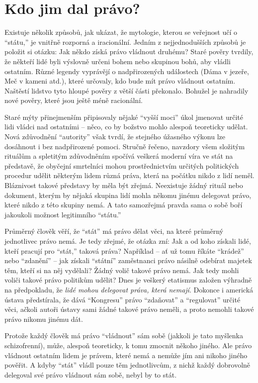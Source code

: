 \documentclass{book}
\begin{document}
\section{Kdo jim dal právo?}

Existuje několik způsobů, jak ukázat, že mytologie, kterou se veřejnost učí o \enquote{státu,} je vnitřně rozporná a iracionální. Jedním z nejjednodušších způsobů je položit si otázku: Jak někdo získá právo vládnout druhému? Staré pověry tvrdily, že někteří lidé byli výslovně určeni bohem nebo skupinou bohů, aby vládli ostatním. Různé legendy vyprávějí o nadpřirozených událostech (Dáma v jezeře, Meč v kameni atd.), které určovaly, kdo bude mít právo vládnout ostatním. Naštěstí lidstvo tyto hloupé pověry z větší části překonalo. Bohužel je nahradily nové pověry, které jsou ještě méně racionální.

Staré mýty přinejmenším připisovaly nějaké \enquote{vyšší moci} úkol jmenovat určité lidi vládci nad ostatními -- něco, co by božstvo mohlo alespoň teoreticky udělat. Nová zdůvodnění \enquote{autority} však tvrdí, že stejného úžasného výkonu lze dosáhnout i bez nadpřirozené pomoci. Stručně řečeno, navzdory všem složitým rituálům a spletitým zdůvodněním spočívá veškerá moderní víra ve stát na představě, že obyčejní smrtelníci mohou prostřednictvím určitých politických procedur udělit některým lidem různá práva, která na počátku nikdo z lidí neměl. Bláznivost takové představy by měla být zřejmá. Neexistuje žádný rituál nebo dokument, kterým by nějaká skupina lidí mohla někomu jinému delegovat právo, které nikdo z této skupiny nemá. A tato samozřejmá pravda sama o sobě boří jakoukoli možnost legitimního \enquote{státu.}

Průměrný člověk věří, že \enquote{stát} má právo dělat věci, na které průměrný jednotlivec právo nemá. Je tedy zřejmé, že otázka zní: Jak a od koho získali lidé, kteří pracují pro \enquote{stát,} taková práva? Například -- ať už tomu říkáte \enquote{krádež} nebo \enquote{zdanění} -- jak získali \enquote{státní} zaměstnanci právo násilně odebírat majetek těm, kteří si na něj vydělali? Žádný volič takové právo nemá. Jak tedy mohli voliči takové právo politikům udělit? Dnes je veškerý etatismus založen výhradně na předpokladu, že \emph{lidé mohou delegovat práva, která nemají}. Dokonce i americká ústava předstírala, že dává \enquote{Kongresu} právo \enquote{zdaňovat} a \enquote{regulovat} určité věci, ačkoli autoři ústavy sami žádné takové právo neměli, a proto nemohli takové právo nikomu jinému dát.

Protože každý člověk má právo \enquote{vládnout} sám sobě (jakkoli je tato myšlenka schizofrenní), může, alespoň teoreticky, k tomu zmocnit někoho jiného. Ale právo vládnout ostatním lidem je právem, které nemá a nemůže jím ani nikoho jiného pověřit. A kdyby \enquote{stát} vládl pouze těm jednotlivcům, z nichž každý dobrovolně delegoval své právo vládnout sám sobě, nebyl by to stát.
\end{document}
